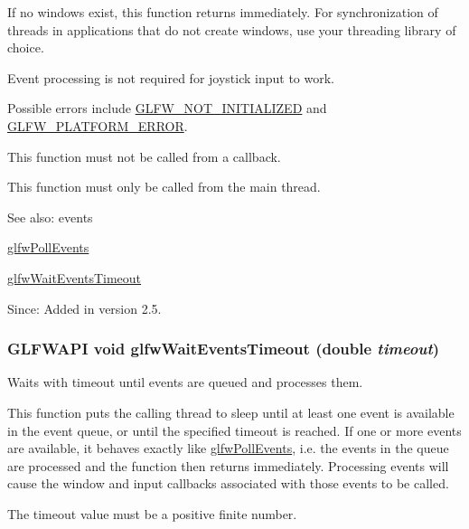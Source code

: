 If no windows exist, this function returns immediately. For synchronization of threads in applications that do not create windows, use your threading library of choice.

Event processing is not required for joystick input to work.

Possible errors include \hyperlink{group__errors_g2374ee02c177f12e1fa76ff3ed15e14a}{GLFW\_\-NOT\_\-INITIALIZED} and \hyperlink{group__errors_gd44162d78100ea5e87cdd38426b8c7a1}{GLFW\_\-PLATFORM\_\-ERROR}.

This function must not be called from a callback.

This function must only be called from the main thread.

\begin{Desc}
\item[See also:]events 

\hyperlink{group__window_g872d16e4c77f58c0436f356255920cfc}{glfwPollEvents} 

\hyperlink{group__window_g05223a0a4c5e50f10f289e60398153aa}{glfwWaitEventsTimeout}\end{Desc}
\begin{Desc}
\item[Since:]Added in version 2.5. \end{Desc}
\hypertarget{group__window_g05223a0a4c5e50f10f289e60398153aa}{
\subsubsection[glfwWaitEventsTimeout]{\setlength{\rightskip}{0pt plus 5cm}GLFWAPI void glfwWaitEventsTimeout (double {\em timeout})}}
\label{group__window_g05223a0a4c5e50f10f289e60398153aa}


Waits with timeout until events are queued and processes them. 

This function puts the calling thread to sleep until at least one event is available in the event queue, or until the specified timeout is reached. If one or more events are available, it behaves exactly like \hyperlink{group__window_g872d16e4c77f58c0436f356255920cfc}{glfwPollEvents}, i.e. the events in the queue are processed and the function then returns immediately. Processing events will cause the window and input callbacks associated with those events to be called.

The timeout value must be a positive finite number.

